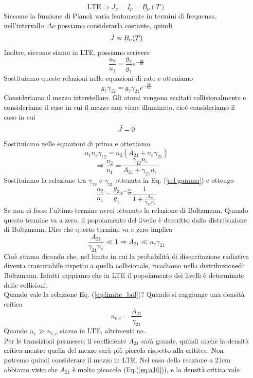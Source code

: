 \[
\text{LTE} \Rightarrow J_\nu = I_\nu =B_\nu(T)
\]
Siccome la funzione di Planck varia lentamente in termini di frequenza, nell'intervallo $\Delta\nu$ possiamo considerarla costante, quindi
\[
\Bar{J}\approx B_\nu(T)
\]
Inoltre, siccome siamo in LTE, possiamo scrivere
\[
    \frac{n_2}{n_1}=\frac{g_2}{g_1}e^{-\frac{h\nu}{kT}}
\]
Sostituiamo queste relazioni nelle equazioni di rate e otteniamo
\begin{equation}
    g_1\gamma_{12} = g_2 \gamma_{21} e^{-\frac{h\nu}{kT}}
    \label{rel-gamma}
\end{equation}
Consideriamo il mezzo interstellare. Gli atomi vengono eccitati collisionalmente e consideriamo il caso in cui il mezzo non viene illuminato, cioé consideriamo il caso in cui
\[
    \Bar{J} = 0
\]
Sostituiamo nelle equazioni di prima e otteniamo
\[
n_1 n_e \gamma_{12} =n_2(A_{21}+n_e\gamma_{21})
\]
\[
 \Rightarrow   \frac{n_2}{n_1}=\frac{\gamma_{12}n_e}{A_{21}+\gamma_{21}n_e}
\]
Sostituiamo la relazione tra $\gamma_{12}$ e $\gamma_{21}$ ottenuta in Eq. (\ref{rel-gamma}) e ottengo
\begin{equation*}
     \frac{n_2}{n_1}=\frac{g_2}{g_1}e^{-\frac{h\nu}{kT}}\frac{1}{1+\frac{A_{21}}{\gamma_{21}n_e}}    
\end{equation*}
Se non ci fosse l'ultimo termine avrei ottenuto la relazione di Boltzmann. Quando questo termine va a zero, il popolamento del livello è descritto dalla distribuzione di Boltzmann. Dire che questo termine va a zero implica
\begin{equation}
    \frac{A_{21}}{\gamma_{21}n_e}\ll 1 \Rightarrow A_{21} \ll n_e\gamma_{21}
    \label{eq:limite_bol}
\end{equation}
Cioè stiamo dicendo che, nel limite in cui la probabilità di diseccitazione radiativa diventa trascurabile rispetto a quella collisionale, ricadiamo nella distribuzionedi Boltzmann. Infatti sappiamo che in LTE il popolamento dei livelli è determinato dalle collisioni. \\
Quando vale la relazione Eq. (\ref{eq:limite_bol})? Quando si raggiunge una densità critica
\[
    n_{e,c} = \frac{A_{21}}{\gamma_{21}}
\]
Quando $n_e\gg n_{e,c} $ siamo in LTE, altrimenti no.\\
Per le transizioni permesse, il coefficiente $A_{21}$ sarà grande, quindi anche la densità critica mentre quella del mezzo sarà più piccola rispetto alla crititca. Non potremo quindi considerare il mezzo in LTE. Nel caso della reazione a 21cm abbiamo visto che $A_{21}$ è molto picocolo (Eq.(\ref{eq:a10})), e la densità critica vale
